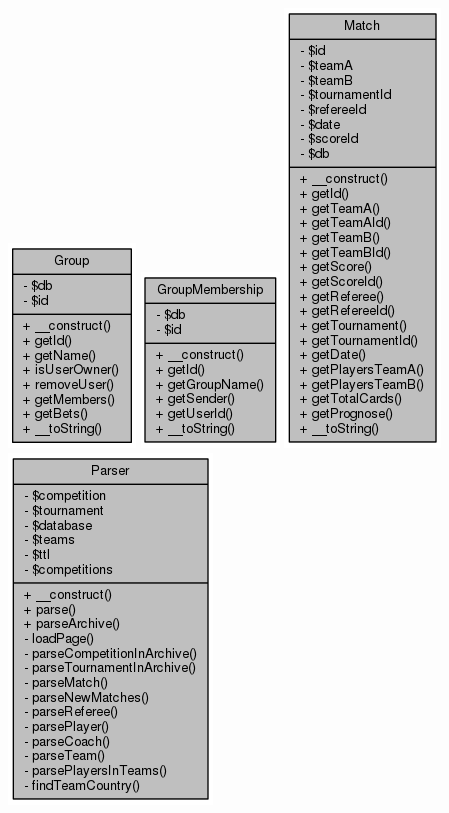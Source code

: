 \documentclass[11pt]{article}
\begin{document}
\includegraphics[scale=0.4]{UML_Group.png}
\includegraphics[scale=0.4]{UML_GroupMembership.png}
\includegraphics[scale=0.4]{UML_Match.png}
\includegraphics[scale=0.4]{UML_Parser.png}
\end{document}
